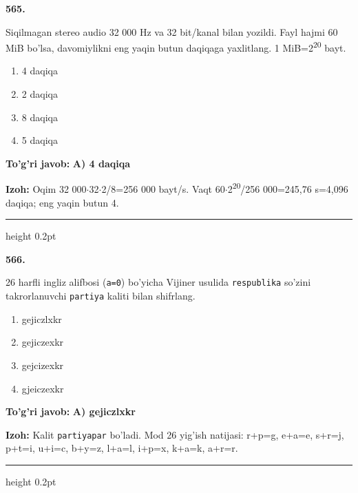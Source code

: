 \documentclass[10pt,a4paper,oneside]{article}
\begin{document}
\noindent\textbf{\color{ink}565.}
\par
Siqilmagan stereo audio 32 000 Hz va 32 bit/kanal bilan yozildi. Fayl hajmi 60 MiB bo'lsa, davomiylikni eng yaqin butun daqiqaga yaxlitlang. 1 MiB=2\textsuperscript{2}\textsuperscript{0} bayt.
\begin{enumerate}[label=\Alph*),leftmargin=9mm]
\item 4 daqiqa
\item 2 daqiqa
\item 8 daqiqa
\item 5 daqiqa
\end{enumerate}
\begin{tcolorbox}[enhanced,breakable,colback=teal!4,colframe=teal!50!black,boxrule=0.5pt,arc=1.1mm,left=3mm,right=3mm,top=1.7mm,bottom=1.7mm,before skip=2mm,after skip=2mm]
\textbf{\color{teal}To'g'ri javob:} \textbf{A) 4 daqiqa}
\par\smallskip
\textbf{Izoh:} Oqim 32 000\ensuremath{\cdot}32\ensuremath{\cdot}2/8=256 000 bayt/s. Vaqt 60\ensuremath{\cdot}2\textsuperscript{2}\textsuperscript{0}/256 000=245,76 s=4,096 daqiqa; eng yaqin butun 4.
\end{tcolorbox}
\vspace{2mm}\hrule height 0.2pt \vspace{3mm}

\noindent\textbf{\color{ink}566.}
\par
26 harfli ingliz alifbosi (\texttt{a=0}) bo'yicha Vijiner usulida \texttt{respublika} so'zini takrorlanuvchi \texttt{partiya} kaliti bilan shifrlang.
\begin{enumerate}[label=\Alph*),leftmargin=9mm]
\item gejiczlxkr
\item gejiczexkr
\item gejcizexkr
\item gjeiczexkr
\end{enumerate}
\begin{tcolorbox}[enhanced,breakable,colback=teal!4,colframe=teal!50!black,boxrule=0.5pt,arc=1.1mm,left=3mm,right=3mm,top=1.7mm,bottom=1.7mm,before skip=2mm,after skip=2mm]
\textbf{\color{teal}To'g'ri javob:} \textbf{A) gejiczlxkr}
\par\smallskip
\textbf{Izoh:} Kalit \texttt{partiyapar} bo'ladi. Mod 26 yig'ish natijasi: r+p=g, e+a=e, s+r=j, p+t=i, u+i=c, b+y=z, l+a=l, i+p=x, k+a=k, a+r=r.
\end{tcolorbox}
\vspace{2mm}\hrule height 0.2pt \vspace{3mm}
\end{document}
